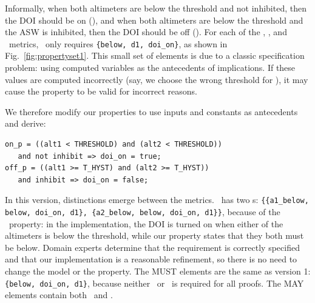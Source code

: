 \noindent Informally, when both altimeters are below the threshold and not inhibited, then the DOI should be on (\onp), and when both altimeters are below the threshold and the ASW is inhibited, then the DOI should be off (\offp).
For each of the \ivccov, \maycov, and \mustcov\ metrics, \allp\ only requires \texttt{\{below, d1, doi\_on\}}, as shown in Fig.~\ref{fig:propertyset1}.   This small set of elements is due to a classic specification problem: using computed variables as the antecedents of implications.  If these values are computed incorrectly (say, we choose the wrong threshold for \aonebelow), it may cause the property to be valid for incorrect reasons.


We therefore modify our properties to use inputs and constants as antecedents and derive:

{\smaller
\begin{verbatim}
on_p = ((alt1 < THRESHOLD) and (alt2 < THRESHOLD))
   and not inhibit => doi_on = true;
off_p = ((alt1 >= T_HYST) and (alt2 >= T_HYST))
   and inhibit => doi_on = false;
\end{verbatim}
}

\noindent In this version, distinctions emerge between the metrics.  \allp\ has two \mivc s: \texttt{\{\{a1\_below, below, doi\_on, d1\}, \{a2\_below, below, doi\_on, d1\}\}}, because of the \onp\ property: in the implementation, the DOI is turned on when either of the altimeters is below the threshold, while our property states that they both must be below.
Domain experts determine that the requirement is correctly specified and that our implementation is a reasonable refinement, so there is no need to change the model or the property.  The MUST elements are the same as version 1: \texttt{\{below, doi\_on, d1\}}, because neither \aonebelow\ or \atwobelow\ is required for all proofs.  %
The MAY elements contain both \aonebelow\ and \atwobelow.

